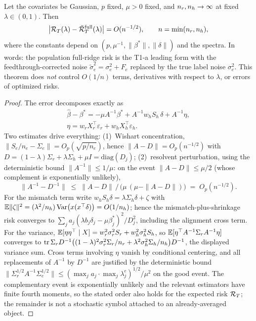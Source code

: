 \begin{theorem}\label{supp:thm:t1b}
Let the covariates be Gaussian, $p$ fixed, $\mu > 0$ fixed, and $n_r, n_h \to \infty$ at fixed $\lambda \in (0,1)$.
Then
\begin{equation}
  \big|\mathcal{R}_T(\lambda)-\bar{\mathcal{R}}_T^{\mathrm{full}}(\lambda)\big| = O(n^{-1/2}),
  \qquad n=\min(n_r,n_h),
  \label{supp:eq:t1b}
\end{equation}
where the constants depend on $(p,\mu^{-1},\|\beta^*\|,\|\delta\|)$ and the spectra.
In words: the population full-ridge risk is the T1-a leading form with the feedthrough-corrected noise $\tilde\sigma_e^2=\sigma_e^2+F_e$ replaced by the true label noise $\sigma_e^2$.
This theorem does \emph{not} control $O(1/n)$ terms, derivatives with respect to $\lambda$, or errors of optimized risks.
\end{theorem}

\begin{proof}
The error decomposes exactly as
\begin{equation}
\begin{gathered}
\hat\beta - \beta^* = -\mu A^{-1}\beta^* + A^{-1} w_h S_h\, \delta + A^{-1}\eta,
\\[2pt]
\eta = w_r X_r^\top\varepsilon_r + w_h X_h^\top\varepsilon_h .
\end{gathered}
\end{equation}
Two estimates drive everything: (1)~Wishart concentration, $\|S_e/n_e - \Sigma_e\| = O_p(\sqrt{p/n_e})$, hence $\|A - D\| = O_p(n^{-1/2})$ with $D = (1-\lambda)\Sigma_r + \lambda\Sigma_h + \mu I = \mathrm{diag}(D_j)$; (2)~resolvent perturbation, using the deterministic bound $\|A^{-1}\| \le 1/\mu$: on the event $\|A-D\| \le \mu/2$ (whose complement is exponentially unlikely),
\begin{equation}
\|A^{-1} - D^{-1}\| \;\le\; \|A-D\|\,\big/\,\big(\mu\,(\mu-\|A-D\|)\big) \;=\; O_p(n^{-1/2}) .
\end{equation}
For the mismatch term write $w_h S_h\delta = \lambda\Sigma_h\delta + \zeta$ with $\mathbb{E}\|\zeta\|^2 = (\lambda^2/n_h)\,\mathrm{Var}\big(x(x^\top\delta)\big) = O(1/n_h)$; hence the mismatch-plus-shrinkage risk converges to $\sum_j a_j(\lambda b_j\delta_j - \mu\beta^*_j)^2/D_j^2$, including the alignment cross term.
For the variance, $\mathbb{E}[\eta\eta^\top \mid X] = w_r^2\sigma_r^2 S_r + w_h^2\sigma_h^2 S_h$, so $\mathbb{E}[\eta^\top A^{-1}\Sigma_r A^{-1}\eta]$ converges to $\mathrm{tr}\, \Sigma_r D^{-1}\big((1-\lambda)^2\sigma_r^2\Sigma_r/n_r + \lambda^2\sigma_h^2\Sigma_h/n_h\big)D^{-1}$, the displayed variance sum.
Cross terms involving $\eta$ vanish by conditional centering, and all replacements of $A^{-1}$ by $D^{-1}$ are justified by the deterministic bound $\|\Sigma_r^{1/2}A^{-1}\Sigma_e^{1/2}\| \le (\max_j a_j \cdot \max_j \lambda^e_j)^{1/2}/\mu^2$ on the good event.
The complementary event is exponentially unlikely and the relevant estimators have finite fourth moments, so the stated order also holds for the expected risk $\mathcal{R}_T$; the remainder is not a stochastic symbol attached to an already-averaged object.
\end{proof}

